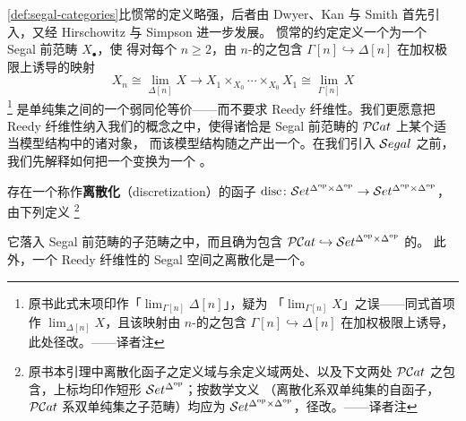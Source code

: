 \cref{def:segal-categories}比惯常的定义略强，后者由 Dwyer、Kan 与 Smith
\cite{bib38} 首先引入，又经 Hirschowitz 与 Simpson \cite{bib56} 进一步发展。
惯常的约定定义一个\trSegalCategories{}为一个 Segal 前范畴 $X_{\bullet}$，使
得对每个 $n\ge 2$，由 $n$-\trSimplex{}的\trSpine{}之包含
$\Gamma[n]\hookrightarrow\Delta[n]$ 在加权极限上诱导的映射
\[
X_{n}\cong\operatorname{lim}_{\Delta[n]}X\longrightarrow
X_{1}\times_{X_{0}}\cdots\times_{X_{0}}X_{1}\cong
\operatorname{lim}_{\Gamma[n]}X
\]
\footnote{原书此式末项印作「$\operatorname{lim}_{\Gamma[n]}\Delta[n]$」，疑为
「$\operatorname{lim}_{\Gamma[n]}X$」之误——同式首项作
$\operatorname{lim}_{\Delta[n]}X$，且该映射由 $n$-\trSimplex{}的\trSpine{}之包含
$\Gamma[n]\hookrightarrow\Delta[n]$ 在加权极限上诱导，此处径改。——译者注}
是单纯集之间的一个弱同伦等价——而不要求 Reedy 纤维性。我们更愿意把 Reedy
纤维性纳入我们的\trSegalCategories{}概念之中，使得诸\trSegalCategories{}恰是
Segal 前范畴的\trCategory{} $\mathcal{P}\mathcal{C}at$ 上某个适当模型结构中的诸\trFibrant{}对象，
而该模型结构随之产出一个\trInfinityCosmos。在我们引入\trInfinityCosmos{}
$\mathcal{S}egal$ 之前，我们先解释如何把一个\trCompleteSegalSpaces{}变换为一个%
\trSegalCategories。

\begin{lemma}\label{lem:discretization}
存在一个称作\textbf{离散化}（discretization）的函子 $\mathrm{disc}\colon\mathcal{S}et^{\Delta^{\mathrm{op}}\times\Delta^{\mathrm{op}}}\to\mathcal{S}et^{\Delta^{\mathrm{op}}\times\Delta^{\mathrm{op}}}$，由下列\trPullback{}定义%
\footnote{原书本引理中离散化函子之定义域与余定义域两处、以及下文两处%
$\mathcal{P}\mathcal{C}at$ 之包含，上标均印作短形 $\mathcal{S}et^{\Delta^{\mathrm{op}}}$；按数学文义
（离散化系双单纯集的自函子，$\mathcal{P}\mathcal{C}at$ 系双单纯集之子范畴）均应为%
$\mathcal{S}et^{\Delta^{\mathrm{op}}\times\Delta^{\mathrm{op}}}$，径改。——译者注}
\begin{center}
\end{center}
它落入 Segal 前范畴的子范畴之中，而且确为包含 $\mathcal{P}\mathcal{C}at\hookrightarrow\mathcal{S}et^{\Delta^{\mathrm{op}}\times\Delta^{\mathrm{op}}}$ 的\trRightAdjoint。
此外，一个 Reedy 纤维性的 Segal 空间之离散化是一个\trSegalCategories。
\end{lemma}

